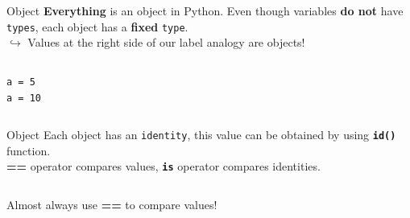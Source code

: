     \begin{frame}{Object}
        \LARGE
        \textbf{Everything} is an object in Python.
         Even though variables \textbf{do not} have \texttt{types}, each object has a \textbf{fixed} \texttt{type}.\\
        $\hookrightarrow$ Values at the right side of our label analogy are objects!

        \begin{columns}
            \begin{column}[c]{0.5\textwidth}
                \LARGE
                \texttt{a = 5}\\
                \texttt{a = 10}\\

            \end{column}
            \begin{column}[c]{0.5\textwidth}
           \end{column}
       \end{columns}
    \end{frame}

    \begin{frame}{Object}
        \LARGE
        Each object has an \texttt{identity},
         this value can be obtained by using \texttt{\textbf{id()}} function.\\
        \textbf{==} operator compares values, \textbf{\texttt{is}} operator compares identities.
        \bigskip
        \inputminted[frame=single,framesep=2pt,lastline=4]{python3}{../Lecture6/code-examples/identity.py}
        Almost always use \textbf{==} to compare values!
    \end{frame}

